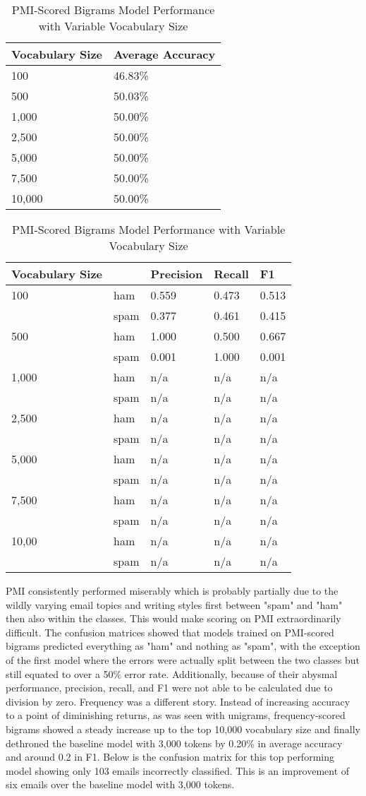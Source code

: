 \documentclass[a4paper]{article}
\begin{document}
	\begin{table}[H]
		\centering
		\caption{PMI-Scored Bigrams Model Performance with Variable Vocabulary Size}
		\begin{tabular}{ll}
			Vocabulary Size & Average Accuracy \\
			\hline
			100 & 46.83\% \\
			500 & 50.03\% \\
			1,000 & 50.00\% \\
			2,500 & 50.00\% \\
			5,000 & 50.00\% \\
			7,500 & 50.00\% \\
			10,000 & 50.00\%
		\end{tabular}
		\begin{tabular}{l|llll}
			Vocabulary Size & & Precision & Recall & F1 \\
			\hline
			100 & ham  & 0.559 & 0.473 & 0.513 \\
				& spam & 0.377 & 0.461 & 0.415 \\
			\hline
			500 & ham  & 1.000 & 0.500 & 0.667 \\
				& spam & 0.001 & 1.000 & 0.001 \\
			\hline
			1,000 & ham  & n/a & n/a & n/a \\
			      & spam & n/a & n/a & n/a \\
			\hline
			2,500 & ham  & n/a & n/a & n/a \\
				  & spam & n/a & n/a & n/a \\
			\hline
			5,000 & ham  & n/a & n/a & n/a \\
				  & spam & n/a & n/a & n/a \\
			\hline
			7,500 & ham  & n/a & n/a & n/a \\
				  & spam & n/a & n/a & n/a \\
			\hline
			10,00 & ham  & n/a & n/a & n/a \\
				  & spam & n/a & n/a & n/a \\
		\end{tabular}
	\end{table}
	
	PMI consistently performed miserably which is probably partially due to the wildly varying email topics and writing styles first between "spam" and "ham" then also within the classes. This would make scoring on PMI extraordinarily difficult. The confusion matrices showed that models trained on PMI-scored bigrams predicted everything as "ham" and nothing as "spam", with the exception of the first model where the errors were actually split between the two classes but still equated to over a 50\% error rate. Additionally, because of their abysmal performance, precision, recall, and F1 were not able to be calculated due to division by zero. Frequency was a different story. Instead of increasing accuracy to a point of diminishing returns, as was seen with unigrams, frequency-scored bigrams showed a steady increase up to the top 10,000 vocabulary size and finally dethroned the baseline model with 3,000 tokens by 0.20\% in average accuracy and around 0.2 in F1. Below is the confusion matrix for this top performing model showing only 103 emails incorrectly classified. This is an improvement of six emails over the baseline model with 3,000 tokens.
\end{document}
